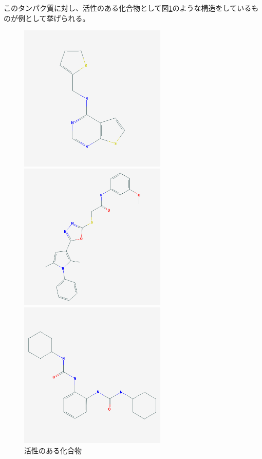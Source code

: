 \documentclass[a4j,11pt]{jarticle}
\begin{document}
このタンパク質に対し、活性のある化合物として図\ref{active}のような構造をしているものが例として挙げられる。

\begin{figure}[H]
	\begin{minipage}{0.33\hsize}
		\begin{center}
			\includegraphics[width=7cm, bb=0 0 500 500]{../pictures/active/1.png}
		\end{center}
	\end{minipage}
	\begin{minipage}{0.33\hsize}
		\begin{center}
			\includegraphics[width=7cm, bb=0 0 500 500]{../pictures/active/2.png}
		\end{center}
	\end{minipage}
	\begin{minipage}{0.33\hsize}
		\begin{center}
			\includegraphics[width=7cm, bb=0 0 500 500]{../pictures/active/3.png}
		\end{center}
	\end{minipage}
	\caption{活性のある化合物} \label{active}
\end{figure}
\end{document}
